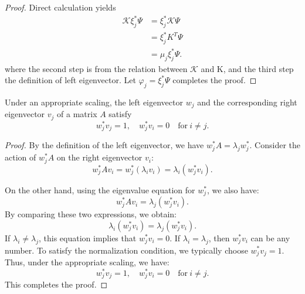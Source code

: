 \documentclass[en, bibend=bibtex]{elegantpaper}
\theoremstyle{plain}
\begin{document}
\begin{proof}
  Direct calculation yields
  \begin{align*}
    \mathcal{K} \xi_j^\ast \Psi &= \xi_j^\ast \mathcal{K} \Psi\\
                             &= \xi_j^\ast K^T \Psi\\
                             &= \mu_j \xi_j^\ast \Psi.
  \end{align*}
  where the second step is from the relation between $\mathcal{K}$ and K,
  and the third step the definition of left eigenvector.
  Let $\varphi_j = \xi_j^\ast \Psi$ completes the proof.
\end{proof}

\begin{lemma}
  \label{lem:lemma-of-expression-of-g}
  Under an appropriate scaling,
  the left eigenvector $w_j$ and the corresponding
  right eigenvector $v_j$ of a matrix $A$ satisfy
  \begin{equation}
    \label{eq:relation-between-right-and-left-eigenvector}
    w_j^{\ast} v_j = 1, \quad w_j^{\ast}v_i = 0 \quad  \mathrm{for} ~ i \neq j.
  \end{equation}
\end{lemma}

\begin{proof}
  By the definition of the left eigenvector, we have $w_j^\ast A = \lambda_j w_j^\ast$.
  Consider the action of $w_j^\ast A$ on the right eigenvector $v_i$:
  \begin{equation*}
  w_j^\ast A v_i = w_j^\ast (\lambda_i v_i) = \lambda_i (w_j^\ast v_i).
  \end{equation*}

  On the other hand, using the eigenvalue equation for $w_j^\ast$, we also have:
  \begin{equation*}
  w_j^\ast A v_i = \lambda_j (w_j^\ast v_i).
  \end{equation*}
  By comparing these two expressions, we obtain:
  \begin{equation*}
  \lambda_i (w_j^\ast v_i) = \lambda_j (w_j^\ast v_i).
  \end{equation*}
  If $\lambda_i \neq \lambda_j$, this equation implies that $w_j^\ast v_i = 0$.
  If $\lambda_i = \lambda_j$, then $w_j^\ast v_i$ can be any number.
  To satisfy the normalization condition, we typically choose $w_j^\ast v_j = 1$.
  Thus, under the appropriate scaling, we have:
  \begin{equation*}
  w_j^\ast v_j = 1, \quad w_j^\ast v_i = 0 \quad \mathrm{for} ~  i \neq j.
  \end{equation*}
  This completes the proof.
\end{proof}
\end{document}
